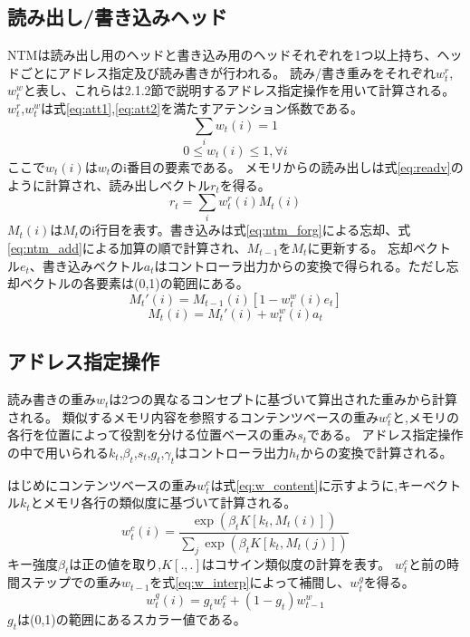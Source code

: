 \subsection{読み出し/書き込みヘッド}
NTMは読み出し用のヘッドと書き込み用のヘッドそれぞれを1つ以上持ち、ヘッドごとにアドレス指定及び読み書きが行われる。
読み/書き重みをそれぞれ$w^r_t$,$w^w_t$と表し、これらは2.1.2節で説明するアドレス指定操作を用いて計算される。
$w^r_t$,$w^w_t$は式\ref{eq:att1},\ref{eq:att2}を満たすアテンション係数である。
\begin{equation} \label{eq:att1}
	\sum_{i}w_t(i) = 1
\end{equation}
\begin{equation} \label{eq:att2}
	0\leq w_t(i)\leq 1 , \forall i
\end{equation}
ここで$w_t(i)$は$w_t$のi番目の要素である。
メモリからの読み出しは式\ref{eq:readv}のように計算され、読み出しベクトル$r_t$を得る。
\begin{equation}\label{eq:readv}
	r_t = \sum_{i}w^r_t(i)M_t(i)
\end{equation}
$M_t(i)$は$M_t$のi行目を表す。書き込みは式\ref{eq:ntm_forg}による忘却、式\ref{eq:ntm_add}による加算の順で計算され、$M_{t-1}$を$M_t$に更新する。
忘却ベクトル$e_t$、書き込みベクトル$a_t$はコントローラ出力からの変換で得られる。ただし忘却ベクトルの各要素は(0,1)の範囲にある。
\begin{equation} \label{eq:ntm_forg}
	M_t'(i) = M_{t-1}(i)[1-w^w_t(i)e_t]
\end{equation}
\begin{equation} \label{eq:ntm_add}
	M_t(i) = M_t'(i) + w^w_t(i)a_t
\end{equation}

\subsection{アドレス指定操作}
読み書きの重み$w_t$は2つの異なるコンセプトに基づいて算出された重みから計算される。
類似するメモリ内容を参照するコンテンツベースの重み$w^c_t$と,メモリの各行を位置によって役割を分ける位置ベースの重み$s_t$である。
アドレス指定操作の中で用いられる$k_t$,$\beta_t$,$s_t$,$g_t$,$\gamma_t$はコントローラ出力$h_t$からの変換で計算される。

はじめにコンテンツベースの重み$w^c_t$は式\ref{eq:w_content}に示すように,キーベクトル$k_t$とメモリ各行の類似度に基づいて計算される。
\begin{equation} \label{eq:w_content}
	w^c_t(i) =\frac{\exp(\beta_tK\left[k_t,M_t(i)\right] ) }{\sum_j\exp(\beta_tK\left[k_t,M_t(j)\right] )}  
\end{equation}
キー強度$\beta_t$は正の値を取り,$K[.,.]$はコサイン類似度の計算を表す。
$w^c_t$と前の時間ステップでの重み$w_{t-1}$を式\ref{eq:w_interp}によって補間し、$w^g_t$を得る。
\begin{equation} \label{eq:w_interp}
	w^g_t(i) = g_t w^c_t+(1-g_t)w^w_{t-1}
\end{equation}
$g_t$は(0,1)の範囲にあるスカラー値である。

